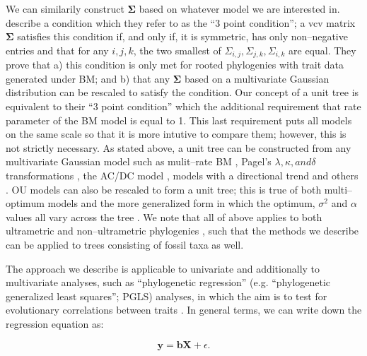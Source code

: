 \documentclass[12pt]{article}
\begin{document}
We can similarily construct $\mathbf{\Sigma}$ based on whatever model we are interested in. \citet{HoAne2013} describe a condition which they refer to as the ``3 point condition''; a vcv matrix $\mathbf{\Sigma}$ satisfies this condition if, and only if, it is symmetric, has only non--negative entries and that for any $i,j,k$, the two smallest of $\Sigma_{i,j}, \Sigma_{j,k}, \Sigma_{i,k}$ are equal. They prove that a) this condition is only met for rooted phylogenies with trait data generated under BM; and b) that any $\mathbf{\Sigma}$ based on a multivariate Gaussian distribution can be rescaled to satisfy the condition. Our concept of a unit tree is equivalent to their ``3 point condition'' which the additional requirement that rate parameter of the BM model is equal to 1. This last requirement puts all models on the same scale so that it is more intutive to compare them; however, this is not strictly necessary. As stated above, a unit tree can be constructed from any multivariate Gaussian model such as mulit--rate BM \citep{Omeara2006, Thomas2006, Eastman2011, Revell2012, Motmot}, Pagel's $\lambda, \kappa, and \delta$ transformations \citep{Pagel1997, Pagel1999}, the AC/DC model \citep{Blomberg2003} \citep[a.k.a. `EB';][]{Harmon2010, SlaterPennell}, models with a directional trend \citep{Hunt2008} and others \citep[e.g.][]{SlaterMEE}. OU models can also be rescaled to form a unit tree; this is true of both multi--optimum \citep{ButlerKing2004} models and the more generalized form \citep{Beaulieu2012, IngramMahler, UyedaBayou} in which the optimum, $\sigma^2$ and $\alpha$ values all vary across the tree \citep{HoAne2013}. We note that all of above applies to both ultrametric and non--ultrametric phylogenies \citep{HoAne2013}, such that the methods we describe can be applied to trees consisting of fossil taxa as well.

The approach we describe is applicable to univariate and additionally to multivariate analyses, such as ``phylogenetic regression'' (e.g. ``phylogenetic generalized least squares''; PGLS) analyses, in which the aim is to test for evolutionary correlations between traits \citep{Grafen1989, Rohlf2001}. In general terms, we can write down the regression equation as:

\begin{equation}
\mathbf{y} = \mathbf{b}\mathbf{X} + \epsilon .
\end{equation}
\end{document}
